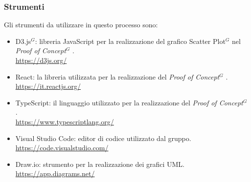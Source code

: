 \setlength\extrarowheight{0pt}

\subsubsection{Strumenti}
Gli strumenti da utilizzare in questo processo sono:
\begin{itemize}
    \item D3.js$^G$: libreria JavaScript per la realizzazione del grafico Scatter Plot$^G$  nel \textit{Proof of Concept}$^G$ .\\
    \href{https://d3js.org/}{https://d3js.org/}
    \item React: la libreria utilizzata per la realizzazione del \textit{Proof of Concept}$^G$ .\\
    \href{https://it.reactjs.org/}{https://it.reactjs.org/}
    \item TypeScript: il linguaggio utilizzato per la realizzazione del \textit{Proof of Concept}$^G$ .\\
    \href{https://www.typescriptlang.org/}{https://www.typescriptlang.org/}
    \item Visual Studio Code: editor di codice utilizzato dal gruppo. \\
    \href{https://code.visualstudio.com/}{https://code.visualstudio.com/}
    \item Draw.io: strumento per la realizzazione dei grafici UML.\\
    \href{https://app.diagrams.net/}{https://app.diagrams.net/}
\end{itemize}
